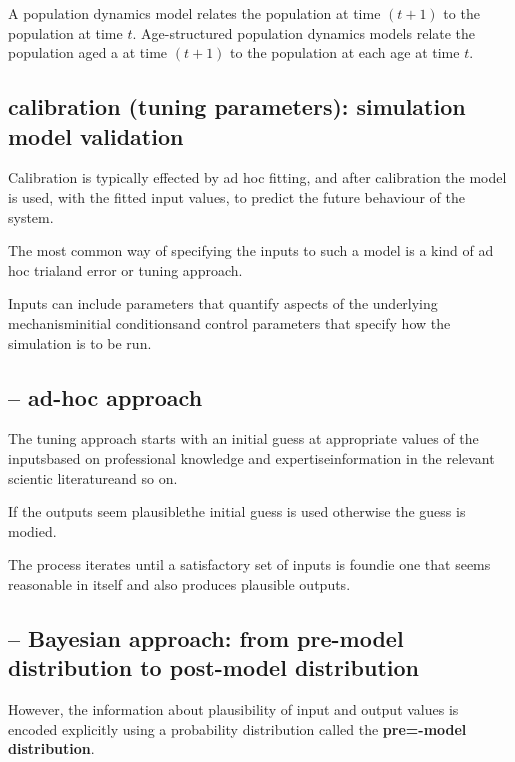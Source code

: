 A population dynamics model relates the population at time $(t+1)$ to the
population at time $t$. Age-structured population dynamics models relate the
population aged a at time $(t+1)$ to the population at each age at time $t$.
 

 

\subsection{calibration (tuning parameters): simulation model validation}
\label{sec:calibration-model-parameters}

Calibration is typically effected by ad hoc fitting, and after calibration the
model is used, with the fitted input values, to predict the future behaviour of
the system.

The most common way of specifying the inputs to such a model is a kind of ad
hoc trialand error or tuning approach.

Inputs can include parameters that quantify aspects of the underlying
mechanisminitial conditionsand control parameters that specify how the simulation is to be
run.

\subsection{-- ad-hoc approach}

\begin{mdframed}
The tuning approach starts with an initial guess at appropriate values of the inputsbased
on professional knowledge and expertiseinformation in the relevant scientic literatureand so
on.

If the outputs seem plausiblethe initial guess is used  otherwise the guess is
modied.

The process iterates until a satisfactory set of inputs is foundie one that
seems reasonable in itself and also produces plausible outputs.

\end{mdframed}

\subsection{-- Bayesian approach: from pre-model distribution to post-model distribution}

However, the information about plausibility of input and output values is
encoded explicitly using a probability distribution called the {\bf pre=-model
distribution}.


